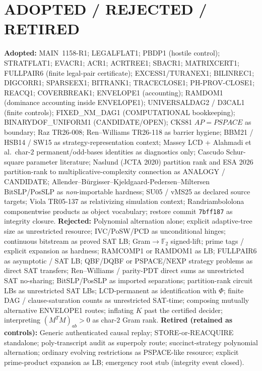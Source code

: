 \documentclass[11pt]{article}
\begin{document}
\section*{ADOPTED / REJECTED / RETIRED}
\textbf{Adopted:} MAIN~1158-R1; LEGALFLAT1; PBDP1 (hostile control); STRATFLAT1;
EVACR1; ACR1; ACRTREE1; SBACR1; MATRIXCERT1; FULLPAIR6 (finite legal-pair
certificate); EXCESS1/TURANEX1; BILINREC1; DIGCORR1; SPARSEEX1; BITRANK1;
TRACECLOSE1; PH-PROV-CLOSE1; REACQ1; COVERBREAK1; ENVELOPE1 (accounting);
RAMDOM1 (dominance accounting inside ENVELOPE1); UNIVERSALDAG2 / D3CAL1 (finite
controls); FIXED\_NM\_DAG1 (COMPUTATIONAL bookkeeping); BINARYDOF\_UNIFORM1
(CANDIDATE/OPEN); CKS81 $AP=PSPACE$ as boundary; Raz TR26-008; Ren--Williams
TR26-118 as barrier hygiene; BBM21 / HSB14 / SW15 as strategy-representation
context; Massey LCD + Alahmadi et al.\ char-$2$ permanent/odd-bases identities as
diagnostics only; Cascudo Schur-square parameter literature; Naslund (JCTA 2020)
partition rank and ESA 2026 partition-rank to multiplicative-complexity connection
as ANALOGY / CANDIDATE; Allender--B\"urgisser--Kjeldgaard-Pedersen--Miltersen
BitSLP/PosSLP as \emph{non}-importable hardness; SU05 / vMS25 as declared source
targets; Viola TR05-137 as relativizing simulation context; Randriambololona
componentwise products as object vocabulary; restore commit \texttt{7bff187} as
integrity closure.
\textbf{Rejected:} Polynomial alternation alone; explicit adaptive-tree size as
unrestricted resource; IVC/PoSW/PCD as unconditional hinges; continuous bitstream
as proved SAT LB; Gram$\to\mathbb F_2$ signed-lift; prime tags / explicit expansion
as hardness; RAMCOMP1 or RAMDOM1 as LB; FULLPAIR6 as asymptotic / SAT LB;
QBF/DQBF or PSPACE/NEXP strategy problems as direct SAT transfers; Ren--Williams /
parity-PDT direct sums as unrestricted SAT no-sharing; BitSLP/PosSLP as imported
separations; partition-rank circuit LBs as unrestricted SAT LBs; LCD-permanent as
identification with $\Phi$; finite DAG / clause-saturation counts as unrestricted
SAT-time; composing mutually alternative ENVELOPE1 routes; inflating $K$ past the
certified decider; interpreting $(M^TM)_{ab}>0$ as char-$2$ Gram rank.
\textbf{Retired (retained as controls):} Generic authenticated causal replay;
STORE-or-REACQUIRE standalone; poly-transcript audit as superpoly route;
succinct-strategy polynomial alternation; ordinary evolving restrictions as
PSPACE-like resource; explicit prime-product expansion as LB; emergency root stub
(integrity event closed).
\end{document}

